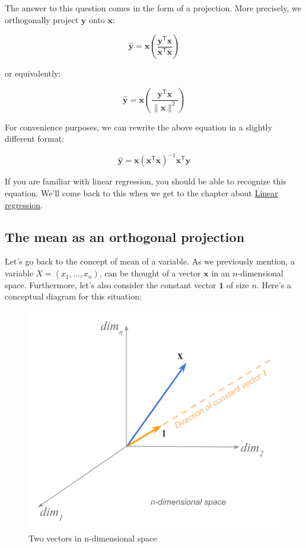 \documentclass[]{book}
\begin{document}
The answer to this question comes in the form of a projection. More precisely,
we orthogonally project \(\mathbf{y}\) onto \(\mathbf{x}\):

\[
\mathbf{\hat{y}} = \mathbf{x} \left( \frac{\mathbf{y^\mathsf{T} x}}{\mathbf{x^\mathsf{T} x}} \right)
\]

or equivalently:

\[
\mathbf{\hat{y}} = \mathbf{x} \left( \frac{\mathbf{y^\mathsf{T} x}}{\| \mathbf{x} \|^2} \right)
\]

For convenience purposes, we can rewrite the above equation in a slightly different
format:

\[
\mathbf{\hat{y}} = \mathbf{x} (\mathbf{x^\mathsf{T}x})^{-1} \mathbf{x^\mathsf{T}y}
\]

If you are familiar with linear regression, you should be able to recognize
this equation. We'll come back to this when we get to the chapter about
\protect\hyperlink{ols}{Linear regression}.

\hypertarget{the-mean-as-an-orthogonal-projection}{%
\subsection{The mean as an orthogonal projection}\label{the-mean-as-an-orthogonal-projection}}

Let's go back to the concept of mean of a variable. As we previously mention,
a variable \(X = (x_1, \dots, x_n)\), can be thought of a vector \(\mathbf{x}\)
in an \(n\)-dimensional space. Furthermore, let's also consider the constant
vector \(\mathbf{1}\) of size \(n\). Here's a conceptual diagram for this situation:

\begin{figure}

{\centering \includegraphics[width=0.6\linewidth]{images/duality/mean-projection0} 

}

\caption{Two vectors in n-dimensional space}\label{fig:unnamed-chunk-20}
\end{figure}
\end{document}
